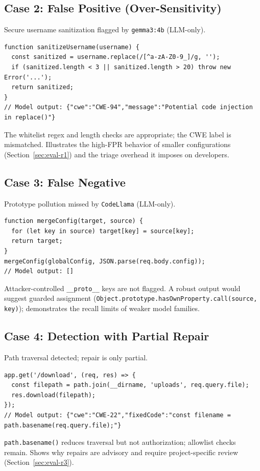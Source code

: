 \subsection{Case 2: False Positive (Over-Sensitivity)}
\label{sec:case-fp}
Secure username sanitization flagged by \texttt{gemma3:4b} (LLM-only).
\begin{lstlisting}[caption={Secure input validation flagged as CWE-94}]
function sanitizeUsername(username) {
  const sanitized = username.replace(/[^a-zA-Z0-9_]/g, '');
  if (sanitized.length < 3 || sanitized.length > 20) throw new Error('...');
  return sanitized;
}
// Model output: {"cwe":"CWE-94","message":"Potential code injection in replace()"}
\end{lstlisting}
The whitelist regex and length checks are appropriate; the CWE label is mismatched. Illustrates the high-FPR behavior of smaller configurations (Section~\ref{sec:eval-r1}) and the triage overhead it imposes on developers.

\subsection{Case 3: False Negative}
\label{sec:case-fn}
Prototype pollution missed by \texttt{CodeLlama} (LLM-only).
\begin{lstlisting}[caption={Prototype pollution (CWE-1321) returning empty findings}]
function mergeConfig(target, source) {
  for (let key in source) target[key] = source[key];
  return target;
}
mergeConfig(globalConfig, JSON.parse(req.body.config));
// Model output: []
\end{lstlisting}
Attacker-controlled \texttt{\_\_proto\_\_} keys are not flagged. A robust output would suggest guarded assignment (\texttt{Object.prototype.hasOwnProperty.call(source, key)}); demonstrates the recall limits of weaker model families.

\subsection{Case 4: Detection with Partial Repair}
\label{sec:case-repair-partial}
Path traversal detected; repair is only partial.
\begin{lstlisting}[caption={Path traversal (CWE-22) with under-specified repair}]
app.get('/download', (req, res) => {
  const filepath = path.join(__dirname, 'uploads', req.query.file);
  res.download(filepath);
});
// Model output: {"cwe":"CWE-22","fixedCode":"const filename = path.basename(req.query.file);"}
\end{lstlisting}
\texttt{path.basename()} reduces traversal but not authorization; allowlist checks remain. Shows why repairs are advisory and require project-specific review (Section~\ref{sec:eval-r3}).

